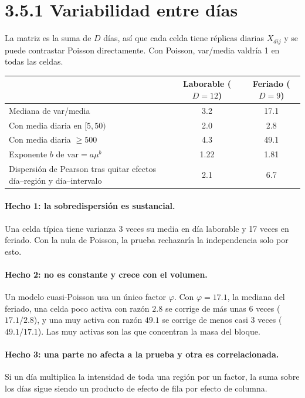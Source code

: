 \documentclass[11pt,a4paper]{article}
\begin{document}
\section{3.5.1 Variabilidad entre días}

La matriz es la suma de $D$ días, así que cada celda tiene réplicas diarias
$X_{dij}$ y se puede contrastar Poisson directamente. Con Poisson, var/media valdría
1 en todas las celdas.

\begin{center}
\small
\begin{tabular}{@{}lcc@{}}
\toprule
 & Laborable ($D=12$) & Feriado ($D=9$) \\
\midrule
Mediana de var/media & 3.2 & 17.1 \\
Con media diaria en $[5,50)$ & 2.0 & 2.8 \\
Con media diaria $\ge500$ & 4.3 & 49.1 \\
Exponente $b$ de $\mathrm{var}=a\mu^b$ & 1.22 & 1.81 \\
Dispersión de Pearson tras quitar efectos día--región y día--intervalo & 2.1 & 6.7 \\
\bottomrule
\end{tabular}
\end{center}

\paragraph{Hecho 1: la sobredispersión es sustancial.} Una celda típica tiene
varianza 3 veces su media en día laborable y 17 veces en feriado. Con la nula de
Poisson, la prueba rechazaría la independencia solo por esto.

\paragraph{Hecho 2: no es constante y crece con el volumen.} Un modelo
cuasi-Poisson usa un único factor $\varphi$. Con $\varphi=17.1$, la mediana del
feriado, una celda poco activa con razón $2.8$ se corrige de más unas 6 veces
($17.1/2.8$), y una muy activa con razón $49.1$ se corrige de menos casi 3 veces
($49.1/17.1$). Las muy activas son las que concentran la masa del bloque.

\paragraph{Hecho 3: una parte no afecta a la prueba y otra es correlacionada.} Si un
día multiplica la intensidad de toda una región por un factor, la suma sobre los
días sigue siendo un producto de efecto de fila por efecto de columna.
\end{document}
